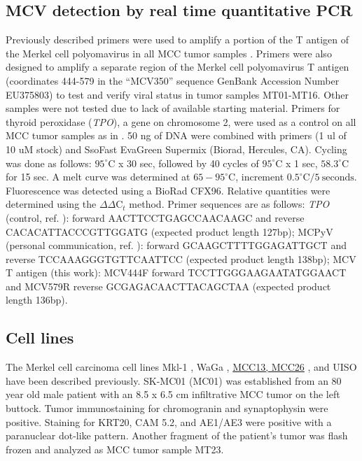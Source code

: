 \documentclass[10pt]{article}
\begin{document}
\subsection*{MCV detection by real time quantitative PCR}
Previously described primers were used to amplify a portion of the T antigen of the Merkel cell polyomavirus in all MCC tumor samples \cite[personal~communication]{Garneski2008Merkel}.
Primers were also designed to amplify a separate region of the Merkel cell polyomavirus T antigen (coordinates 444-579 in the ``MCV350'' sequence GenBank Accession Number EU375803) to test and verify viral status in tumor samples MT01-MT16.
Other samples were not tested due to lack of available starting material.
Primers for thyroid peroxidase (\emph{TPO}), a gene on chromosome 2, were used as a control on all MCC tumor samples as in \citep{Paulson2008ArrayCGH}.
50 ng of DNA were combined with primers (1 ul of 10 uM stock) and SsoFast EvaGreen Supermix (Biorad, Hercules, CA).
Cycling was done as follows: $95^{\circ}\mathrm{C}$ x 30 sec, followed by 40 cycles of $95^{\circ}\mathrm{C}$ x 1 sec, $58.3^{\circ}\mathrm{C}$ for 15 sec.
A melt curve was determined at $65-95^{\circ}\mathrm{C}$, increment $0.5^{\circ}\mathrm{C}/5\mathrm{~seconds}$.
Fluorescence was detected using a BioRad CFX96.
Relative quantities were determined using the $\Delta\Delta\mathrm{C}_t$ method.
Primer sequences are as follows: \emph{TPO} (control, ref. \citep{Paulson2008ArrayCGH}): forward AACTTCCTGAGCCAACAAGC and reverse CACACATTACCCGTTGGATG (expected product length 127bp);
MCPyV (personal communication, ref. \citep{Garneski2008Merkel}): forward GCAAGCTTTTGGAGATTGCT and reverse TCCAAAGGGTGTTCAATTCC (expected product length 138bp);
MCV T antigen (this work): MCV444F forward TCCTTGGGAAGAATATGGAACT and MCV579R reverse GCGAGACAACTTACAGCTAA (expected product length 136bp).

\subsection*{Cell lines}
The Merkel cell carcinoma cell lines Mkl-1 \citep{Rosen1987Establishment}, WaGa \citep{Houben2010Merkel}, \uline{MCC13, MCC26} \citep{Leonard1995Characterisation}, and UISO \citep{Ronan1993Merkel} have been described previously.
SK-MC01 (MC01) was established from an 80 year old male patient with an 8.5 x 6.5 cm infiltrative MCC tumor on the left buttock.
Tumor immunostaining for chromogranin and synaptophysin were positive.
Staining for KRT20, CAM 5.2, and AE1/AE3 were positive with a paranuclear dot-like pattern.
Another fragment of the patient’s tumor was flash frozen and analyzed as MCC tumor sample MT23.
\end{document}

